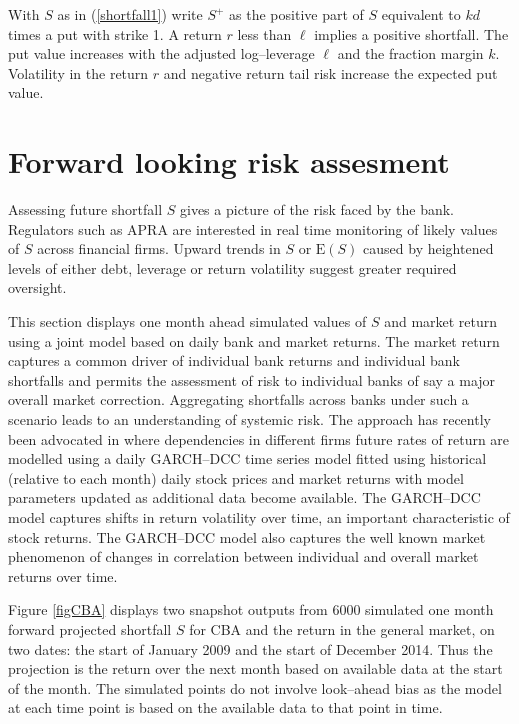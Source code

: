 \documentclass[authoryear]{elsarticle}
\newcommand{\E}{{\mathrm E}}
\newcommand{\eref}[1]{(\ref{#1})}
\newcommand{\fref}[1]{Figure \ref{#1}}
\begin{document}
With $S$  as in \eref{shortfall1} write $S^+$ as the positive part of $S$ equivalent to  $kd$ times a put with strike 1.   A return $r$ less than $\ell$ implies a positive shortfall.   The put value increases  with the adjusted log--leverage   $\ell$ and the fraction margin $k$.       Volatility in the return $r$ and negative return tail risk  increase the expected put value.  

\section{Forward looking risk assesment}\label{s_forward}

Assessing future shortfall  $S$  gives a picture of the risk faced by the bank.  Regulators such as APRA are interested in real time monitoring of likely values of $S$ across  financial firms. Upward trends in $S$ or $\E(S)$ caused by heightened levels of either debt, leverage or return volatility  suggest  greater required oversight.

This section displays one month ahead simulated values of $S$ and market return  using a joint model based on daily bank and market returns.   The market return captures  a common driver of individual bank returns and individual bank shortfalls and permits the assessment of risk to individual banks of say a major overall market correction.    Aggregating shortfalls across banks  under such a scenario leads to an understanding of systemic risk.   The approach has recently been advocated in  \cite{brownlees2015} where dependencies in different firms  future rates of return  are modelled  using a daily GARCH--DCC time series model fitted using historical (relative to each month)  daily stock prices and market returns with  model parameters updated  as additional data become available.   The GARCH--DCC model  \citep{engle2002dynamic} captures shifts in return volatility over time, an important characteristic of stock returns. The GARCH--DCC model also captures the well known market phenomenon of changes in correlation between individual and overall market returns over time.    

 \fref{figCBA}   displays two snapshot outputs from  6000  simulated one month forward projected shortfall $S$ for  CBA and the return in the general market, on  two dates: the start of January 2009 and the start of December 2014.  Thus the projection is the return over the next month based on available data at the start of the month. The simulated points do not involve look--ahead bias as the model at each time point is based on the available data to that point in time. 
 
\end{document}
